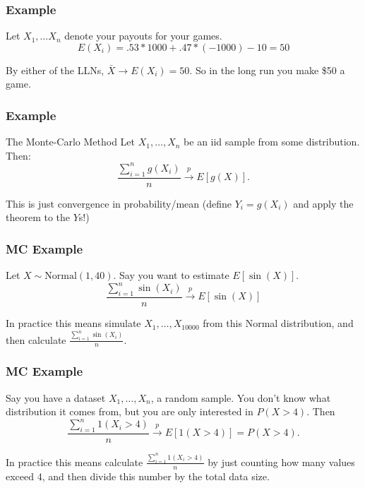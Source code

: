 \documentclass{beamer}
\begin{document}

\begin{frame}
\frametitle{Example}

Let $X_1, \ldots X_n$ denote your payouts for your games. 
\[
E(X_i) = .53*1000 + .47*(-1000) - 10 = 50
\]

By either of the LLNs, $\bar{X} \rightarrow E(X_i) = 50$. So in the long run you make \$50 a game.

\end{frame}


\begin{frame}
\frametitle{Example}

\begin{block}{The Monte-Carlo Method}
Let $X_1, \ldots, X_n$ be an iid sample from some distribution. Then:
\[
\frac{\sum_{i=1}^ng(X_i)}{n} \overset{p}{\to} E[g(X)].
\]
\end{block}

This is just convergence in probability/mean (define $Y_i = g(X_i)$ and apply the theorem to the $Y$s!)

\end{frame}


\begin{frame}
\frametitle{MC Example}

Let $X \sim \text{Normal}(1, 40)$. Say you want to estimate $E[\sin(X)]$. 
\[
\frac{\sum_{i=1}^n \sin(X_i)}{n} \overset{p}{\to} E[\sin(X)]
\]

In practice this means simulate $X_1, \ldots, X_{10000}$ from this Normal distribution, and then calculate $\frac{\sum_{i=1}^n \sin(X_i)}{n}$.

\end{frame}


\begin{frame}
\frametitle{MC Example}

Say you have a dataset $X_1, \ldots, X_n$, a random sample. You don't know what distribution it comes from, but you are only interested in $P(X > 4)$. Then 
\[
\frac{\sum_{i=1}^n 1(X_i>4)}{n} \overset{p}{\to} E[1(X>4)] = P(X>4) .
\]

In practice this means calculate $\frac{\sum_{i=1}^n 1(X_i>4)}{n}$ by just counting how many values exceed $4$, and then divide this number by the total data size.

\end{frame}
\end{document}
